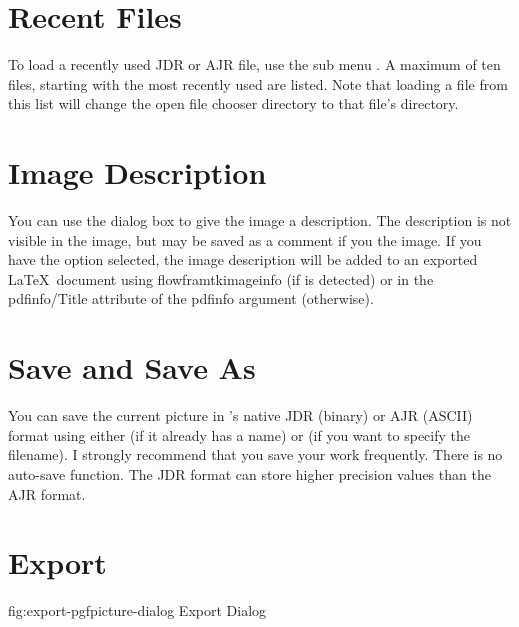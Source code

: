 \section{Recent Files}\label{sec:recentfiles}


To load a recently used \gls{JDR} or \gls{AJR} file, use the sub
menu . A maximum of ten files, starting with the
most recently used are listed. Note that loading a file from this
list will change the open file chooser directory to that file's
directory.

\section{Image Description}\label{sec:imagedescription}


You can use the  dialog box to give the
image a description. The description is not visible in the image,
but may be saved as a comment if you  the image. If
you have the  option selected,
the image description will be added to an exported \LaTeX\ document
using \gls{flowframtkimageinfo} (if  is
detected) or in the \gls{pdfinfo/Title} attribute of the
\gls{pdfinfo} argument (otherwise).

\section{Save and Save As}\label{sec:saveimage}


You can save the current picture in \FlowframTk's native
\gls{JDR} (binary) or \gls{AJR} (ASCII) format using either
 (if it already has a name)
or  (if you want to specify the
filename).  I strongly recommend that you save your work frequently.
There is no auto-save function. The \gls{JDR} format can store
higher precision values than the \gls{AJR} format.

\section{Export}\label{sec:exportimage}


\FloatFig
 {fig:export-pgfpicture-dialog}
 {}
 {Export Dialog}

